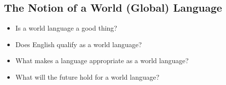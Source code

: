\documentclass[../main.tex]{subfiles}
\begin{document}
    \subsection{The Notion of a World (Global) Language}
        \begin{itemize}
            \item Is a world language a good thing?
            \item Does English qualify as a world language? 
            \item What makes a language appropriate as a world language?
            \item What will the  future hold for a world language?
        \end{itemize}
\end{document}
